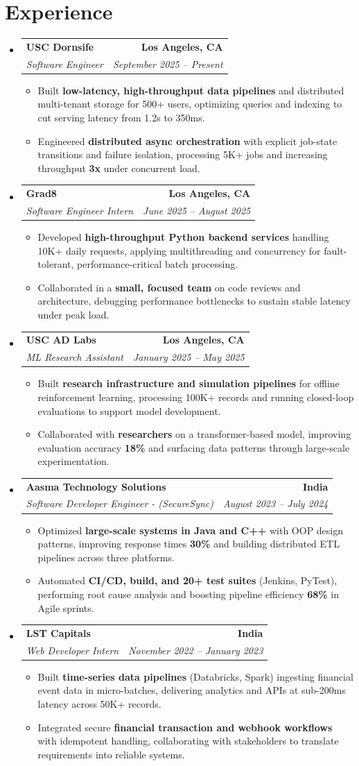 \documentclass[letterpaper,10pt]{article}
\makeatletter
\newcommand{\resumeItem}[1]{\item\small{{#1 \vspace{-2pt}}}}
\newcommand{\resumeSubheading}[4]{\vspace{-1pt}\item\begin{tabular*}{1.0\textwidth}[t]{l@{\extracolsep{\fill}}r}\textbf{#1} & \textbf{\small #2} \\\textit{\small#3} & \textit{\small #4} \\\end{tabular*}\vspace{-2pt}}
\newcommand{\resumeSubHeadingListStart}{\begin{itemize}[leftmargin=0.0in, label={}]}
\newcommand{\resumeSubHeadingListEnd}{\end{itemize}}
\newcommand{\resumeItemListStart}{\begin{itemize}[leftmargin=0.15in,label=\textbullet,itemsep=2pt,topsep=0pt,parsep=0pt,partopsep=0pt]}
\newcommand{\resumeItemListEnd}{\end{itemize}\vspace{-4pt}}
\makeatother
\begin{document}
\section{Experience}
\resumeSubHeadingListStart
\resumeSubheading{USC Dornsife}{Los Angeles, CA}{Software Engineer}{September 2025 -- Present}
\resumeItemListStart
\resumeItem{Built \textbf{low-latency, high-throughput data pipelines} and distributed multi-tenant storage for 500+ users, optimizing queries and indexing to cut serving latency from 1.2s to 350ms.}
\resumeItem{Engineered \textbf{distributed async orchestration} with explicit job-state transitions and failure isolation, processing 5K+ jobs and increasing throughput \textbf{3x} under concurrent load.}
\resumeItemListEnd
\resumeSubheading{Grad8}{Los Angeles, CA}{Software Engineer Intern}{June 2025 -- August 2025}
\resumeItemListStart
\resumeItem{Developed \textbf{high-throughput Python backend services} handling 10K+ daily requests, applying multithreading and concurrency for fault-tolerant, performance-critical batch processing.}
\resumeItem{Collaborated in a \textbf{small, focused team} on code reviews and architecture, debugging performance bottlenecks to sustain stable latency under peak load.}
\resumeItemListEnd
\resumeSubheading{USC AD Labs}{Los Angeles, CA}{ML Research Assistant}{January 2025 -- May 2025}
\resumeItemListStart
\resumeItem{Built \textbf{research infrastructure and simulation pipelines} for offline reinforcement learning, processing 100K+ records and running closed-loop evaluations to support model development.}
\resumeItem{Collaborated with \textbf{researchers} on a transformer-based model, improving evaluation accuracy \textbf{18\%} and surfacing data patterns through large-scale experimentation.}
\resumeItemListEnd
\resumeSubheading{Aasma Technology Solutions}{India}{Software Developer Engineer - (SecureSync)}{August 2023 -- July 2024}
\resumeItemListStart
\resumeItem{Optimized \textbf{large-scale systems in Java and C++} with OOP design patterns, improving response times \textbf{30\%} and building distributed ETL pipelines across three platforms.}
\resumeItem{Automated \textbf{CI/CD, build, and 20+ test suites} (Jenkins, PyTest), performing root cause analysis and boosting pipeline efficiency \textbf{68\%} in Agile sprints.}
\resumeItemListEnd
\resumeSubheading{LST Capitals}{India}{Web Developer Intern}{November 2022 -- January 2023}
\resumeItemListStart
\resumeItem{Built \textbf{time-series data pipelines} (Databricks, Spark) ingesting financial event data in micro-batches, delivering analytics and APIs at sub-200ms latency across 50K+ records.}
\resumeItem{Integrated secure \textbf{financial transaction and webhook workflows} with idempotent handling, collaborating with stakeholders to translate requirements into reliable systems.}
\resumeItemListEnd
\resumeSubHeadingListEnd
\vspace{-6pt}
\end{document}
